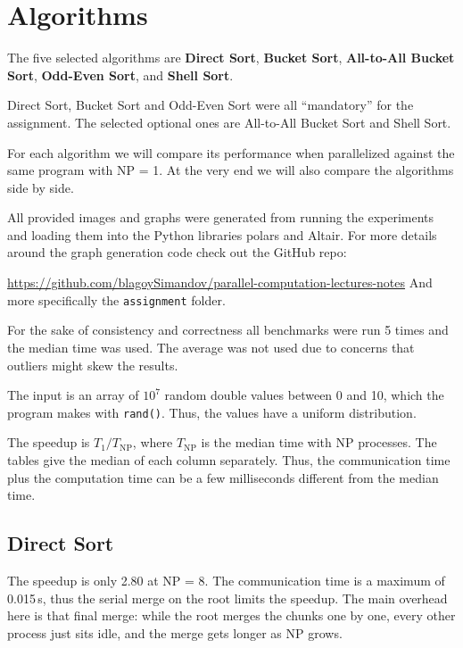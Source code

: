 \section{Algorithms}

The five selected algorithms are \textbf{Direct Sort}, \textbf{Bucket Sort}, \textbf{All-to-All Bucket Sort}, \textbf{Odd-Even Sort}, and \textbf{Shell Sort}.

Direct Sort, Bucket Sort and Odd-Even Sort were all ``mandatory'' for the assignment.
The selected optional ones are All-to-All Bucket Sort and Shell Sort.

For each algorithm we will compare its performance when parallelized against the same program with NP = 1.
At the very end we will also compare the algorithms side by side.

All provided images and graphs were generated from running the experiments and loading them into the Python libraries polars and Altair.
For more details around the graph generation code check out the GitHub repo:

\url{https://github.com/blagoySimandov/parallel-computation-lectures-notes}
And more specifically the \texttt{assignment} folder.

For the sake of consistency and correctness all benchmarks were run 5 times and the median time was used.
The average was not used due to concerns that outliers might skew the results.

The input is an array of $10^7$ random double values between 0 and 10, which the program makes with \texttt{rand()}.
Thus, the values have a uniform distribution.

The speedup is $T_1 / T_\mathrm{NP}$, where $T_\mathrm{NP}$ is the median time with NP processes.
The tables give the median of each column separately.
Thus, the communication time plus the computation time can be a few milliseconds different from the median time.

\subsection{Direct Sort}

\begin{table}[H]
  \centering
  \small
  
  \caption{Direct Sort: median of 5 runs for $n = 10^7$.}
  \label{tab:direct-scaling}
\end{table}

The speedup is only 2.80 at NP = 8.
The communication time is a maximum of 0.015\,s, thus the serial merge on the root limits the speedup.
The main overhead here is that final merge: while the root merges the chunks one by one, every other process just sits idle, and the merge gets longer as NP grows.

